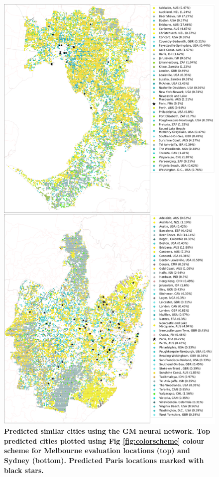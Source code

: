 \documentclass[Crown,sageh,times]{sagej}
\begin{document}
\begin{figure}[!htbp]
\centering   
\includegraphics[scale=0.33]{Images/PlosOne/Fig6.png}  
\caption{\bf Predicted similar cities using the GM neural network. Top predicted cities plotted using Fig \ref{fig:colorscheme} colour scheme for Melbourne evaluation locations (top) and Sydney (bottom). Predicted Paris locations marked with black stars.}    
 \label{fig:melmaps}  
\end{figure} 
\end{document}
